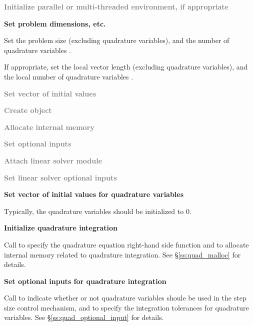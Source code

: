\begin{Steps}
  
\item 
  \textcolor{gray}{\bf Initialize parallel or multi-threaded environment,
  if appropriate}

\item
  {\bf Set problem dimensions, etc.}

  Set the problem size  (excluding quadrature variables),
  and the number of quadrature variables .

  If appropriate, set the local vector length  (excluding quadrature
   variables), and the local number of quadrature variables .
  
\item
  \textcolor{gray}{\bf Set vector of initial values}
 
\item\label{i:quad_cvode_create}
  \textcolor{gray}{\bf Create {\cvodes} object}

\item
  \textcolor{gray}{\bf Allocate internal memory}

\item
  \textcolor{gray}{\bf Set optional inputs}

\item
  \textcolor{gray}{\bf Attach linear solver module}

\item
  \textcolor{gray}{\bf Set linear solver optional inputs}

\item
  {\bf Set vector  of initial values for quadrature variables}

  Typically, the quadrature variables should be initialized to $0$.

\item
  {\bf Initialize quadrature integration}

  Call  to specify the quadrature equation right-hand
  side function and to allocate internal memory related to quadrature integration. 
  See \S\ref{ss:quad_malloc} for details.

\item\label{i:quad_optional_inputs}
  {\bf Set optional inputs for quadrature integration}

  Call  to indicate whether or not quadrature variables
  shoule be used in the step size control mechanism, and to specify the integration 
  tolerances for quadrature variables.
  See \S\ref{ss:quad_optional_input} for details.


\end{Steps}
